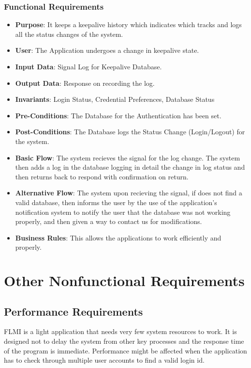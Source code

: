 \subsection{Functional Requirements}
\begin{itemize}
    \item \textbf{Purpose}: It keeps a keepalive history which indicates which tracks and logs all the status changes of the system.
    \item \textbf{User}: The Application undergoes a change in keepalive state.
    \item \textbf{Input Data}: Signal Log for Keepalive Database.
    \item \textbf{Output Data}: Response on recording the log.
    \item \textbf{Invariants}: Login Status, Credential Preferences, Database Status
    \item \textbf{Pre-Conditions}: The Database for the Authentication has been set.
    \item \textbf{Post-Conditions}: The Database logs the Status Change (Login/Logout) for the system.
    \item \textbf{Basic Flow}: The system recieves the signal for the log change. The system then adds a log in the database logging in detail the change in log status and then returns back to respond with confirmation on return.
    \item \textbf{Alternative Flow}: The system upon recieving the signal, if does not find a valid database, then informs the user by the use of the application's notification system to notify the user that the database was not working properly, and then given a way to contact us for modifications.
    \item \textbf{Business Rules}: This allows the applications to work efficiently and properly.
\end{itemize}


\chapter{Other Nonfunctional Requirements}
\label{Other Nonfunctional Requirements}

\section{Performance Requirements}
FLMI is a light application that needs very few system resources to work. It is designed not to delay the system from other key processes and the response time of the program is immediate. Performance might be affected when the application has to check through multiple user accounts to find a valid login id.

